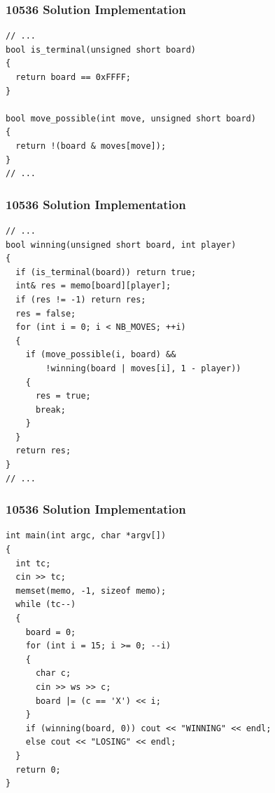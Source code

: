 \documentclass{beamer}
\newcommand{\uvalink}[2]{UVa Online Judge (http://uva.onlinejudge.org)
  problem number \href{#2}{\textcolor{blue}{#1}.}}
\newcommand{\hint}[1]{
\begin{bclogo}[arrondi=0.1, logo=\bclampe]{Hint}
#1
\end{bclogo}
}
\newcounter{exo}
\newcommand{\exo}{
  \addtocounter{exo}{1}
  Exercice \arabic{exo}
}
\begin{document}
\begin{frame}[fragile]
\frametitle{10536 Solution Implementation}

\scriptsize
\begin{lstlisting}
// ...
bool is_terminal(unsigned short board)
{
  return board == 0xFFFF;
}

bool move_possible(int move, unsigned short board)
{
  return !(board & moves[move]);
}
// ...
\end{lstlisting}

\end{frame}

\begin{frame}[fragile]
\frametitle{10536 Solution Implementation}

\scriptsize
\begin{lstlisting}
// ...
bool winning(unsigned short board, int player)
{
  if (is_terminal(board)) return true;
  int& res = memo[board][player];
  if (res != -1) return res;
  res = false;
  for (int i = 0; i < NB_MOVES; ++i)
  {
    if (move_possible(i, board) &&
        !winning(board | moves[i], 1 - player))
    {
      res = true;
      break;
    }
  }
  return res;
}
// ...
\end{lstlisting}

\end{frame}

\begin{frame}[fragile]
\frametitle{10536 Solution Implementation}

\scriptsize
\begin{lstlisting}
int main(int argc, char *argv[])
{
  int tc;
  cin >> tc;
  memset(memo, -1, sizeof memo);
  while (tc--)
  {
    board = 0;
    for (int i = 15; i >= 0; --i)
    {
      char c;
      cin >> ws >> c;
      board |= (c == 'X') << i;
    }
    if (winning(board, 0)) cout << "WINNING" << endl;
    else cout << "LOSING" << endl;
  }
  return 0;
}
\end{lstlisting}

\end{frame}

\fi

\end{document}
